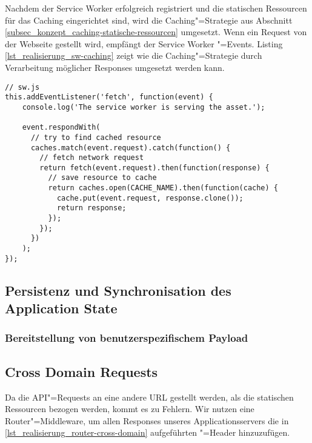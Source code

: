 Nachdem der Service Worker erfolgreich registriert und die statischen Ressourcen für das Caching eingerichtet sind, wird die Caching"=Strategie aus Abschnitt \ref{subsec_konzept_caching-statische-ressourcen} umgesetzt. Wenn ein Request von der Webseite gestellt wird, empfängt der Service Worker "=Events. Listing \ref{lst_realisierung_sw-caching} zeigt wie die Caching"=Strategie durch Verarbeitung möglicher Responses umgesetzt werden kann. \\

\begin{lstlisting}[caption={Verarbeitung empfangener Requests und Auswertung möglicher Responses im Service Worker},label={lst_realisierung_sw-caching}, frame=single]
// sw.js
this.addEventListener('fetch', function(event) {
    console.log('The service worker is serving the asset.');

    event.respondWith(
      // try to find cached resource
      caches.match(event.request).catch(function() {
        // fetch network request
        return fetch(event.request).then(function(response) {
          // save resource to cache
          return caches.open(CACHE_NAME).then(function(cache) {
            cache.put(event.request, response.clone());
            return response;
          });  
        });
      })
    );
});
\end{lstlisting}


\subsection{Persistenz und Synchronisation des Application State}




\subsubsection{Bereitstellung von benutzerspezifischem Payload}



\subsection{Cross Domain Requests}

Da die API"=Requests an eine andere URL gestellt werden, als die statischen Ressourcen bezogen werden, kommt es zu  Fehlern. Wir nutzen eine Router"=Middleware, um allen Responses unseres Applicationsservers die in \ref{lst_realisierung_router-cross-domain} aufgeführten "=Header hinzuzufügen.


